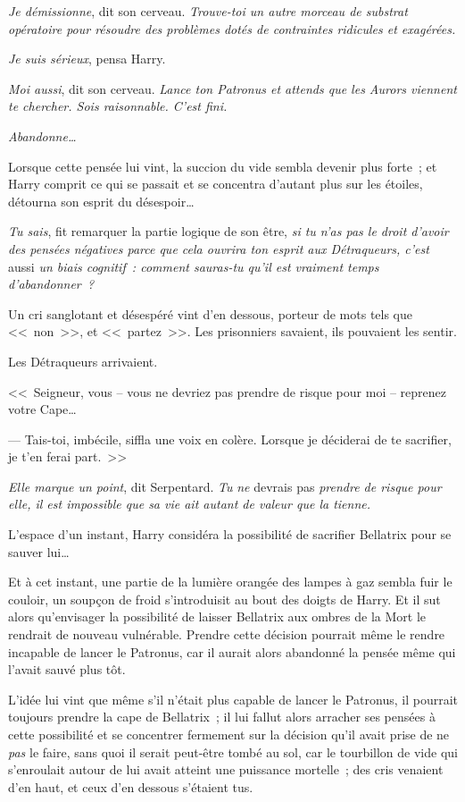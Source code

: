 \emph{Je démissionne}, dit son cerveau. \emph{Trouve-toi un autre morceau de substrat opératoire pour résoudre des problèmes dotés de contraintes ridicules et exagérées.}

\emph{Je suis sérieux}, pensa Harry.

\emph{Moi aussi}, dit son cerveau. \emph{Lance ton Patronus et attends que les Aurors viennent te chercher. Sois raisonnable. C'est fini.}

\emph{Abandonne…}

Lorsque cette pensée lui vint, la succion du vide sembla devenir plus forte~; et Harry comprit ce qui se passait et se concentra d'autant plus sur les étoiles, détourna son esprit du désespoir…

\emph{Tu sais}, fit remarquer la partie logique de son être, \emph{si tu n'as pas le droit d'avoir des pensées négatives parce que cela ouvrira ton esprit aux Détraqueurs, c'est} aussi \emph{un biais cognitif~: comment sauras-tu qu'il est vraiment temps d'abandonner~?}

Un cri sanglotant et désespéré vint d'en dessous, porteur de mots tels que <<~non~>>, et <<~partez~>>. Les prisonniers savaient, ils pouvaient les sentir.

Les Détraqueurs arrivaient.

<<~Seigneur, vous -- vous ne devriez pas prendre de risque pour moi -- reprenez votre Cape…

--- Tais-toi, imbécile, siffla une voix en colère. Lorsque je déciderai de te sacrifier, je t'en ferai part.~>>

\emph{Elle marque un point}, dit Serpentard. \emph{Tu} \emph{ne} devrais pas \emph{prendre de risque pour elle, il est impossible que sa vie ait autant de valeur que la tienne.}

L'espace d'un instant, Harry considéra la possibilité de sacrifier Bellatrix pour se sauver lui…

Et à cet instant, une partie de la lumière orangée des lampes à gaz sembla fuir le couloir, un soupçon de froid s'introduisit au bout des doigts de Harry. Et il sut alors qu'envisager la possibilité de laisser Bellatrix aux ombres de la Mort le rendrait de nouveau vulnérable. Prendre cette décision pourrait même le rendre incapable de lancer le Patronus, car il aurait alors abandonné la pensée même qui l'avait sauvé plus tôt.

L'idée lui vint que même s'il n'était plus capable de lancer le Patronus, il pourrait toujours prendre la cape de Bellatrix~; il lui fallut alors arracher ses pensées à cette possibilité et se concentrer fermement sur la décision qu'il avait prise de ne \emph{pas} le faire, sans quoi il serait peut-être tombé au sol, car le tourbillon de vide qui s'enroulait autour de lui avait atteint une puissance mortelle~; des cris venaient d'en haut, et ceux d'en dessous s'étaient tus.

